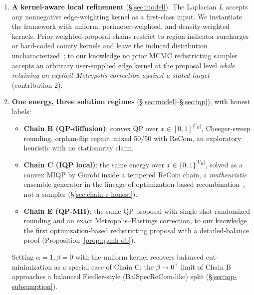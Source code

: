 \documentclass[11pt]{article}
\begin{document}
\begin{enumerate}
  \item \textbf{A kernel-aware local refinement} (\S\ref{sec:model}).
    The Laplacian $L$ accepts any nonnegative edge-weighting kernel
    as a first-class input. We instantiate the framework with
    uniform, perimeter-weighted, and density-weighted kernels. Prior
    weighted-proposal chains restrict to region-indicator surcharges
    or hard-coded county kernels and leave the induced distribution
    uncharacterized~\cite{clelland2022colorado,gerrychain2024,
    tapp2025compactness}; to our knowledge no prior MCMC
    redistricting sampler accepts an arbitrary user-supplied edge
    kernel at the proposal level \emph{while retaining an explicit
    Metropolis correction against a stated target} (contribution 2).

  \item \textbf{One energy, three solution regimes}
    (\S\ref{sec:model}--\S\ref{sec:iqp}), with honest labels:
    \begin{itemize}
      \item \textbf{Chain B (QP-diffusion)}: convex QP over
        $x \in [0,1]^{|V_H|}$, Cheeger-sweep rounding, orphan-flip
        repair, mixed 50/50 with ReCom, an exploratory heuristic
        with no stationarity claim.
      \item \textbf{Chain C (IQP local)}: the same energy over
        $x \in \{0,1\}^{|V_H|}$, solved as a convex MIQP by Gurobi
        inside a tempered ReCom chain, a \emph{matheuristic}
        ensemble generator in the lineage of optimization-based
        recombination~\cite{brous2025recom,cannon2023voting}, not a
        sampler (\S\ref{sec:chain-c-honest}).
      \item \textbf{Chain E (QP-MH)}: the same QP proposal with
        single-shot randomized rounding and an exact
        Metropolis--Hastings correction, to our knowledge the
        first optimization-based redistricting proposal with a
        detailed-balance proof (Proposition~\ref{prop:qpmh-db}).
    \end{itemize}
    Setting $\alpha = 1, \beta = 0$ with the uniform kernel recovers
    balanced cut-minimization as a special case of Chain C; the
    $\beta \to 0^+$ limit of Chain B approaches a balanced
    Fiedler-style (BalSpecReCom-like) split
    (\S\ref{sec:iqp-subsumption}).


\end{enumerate}
\end{document}
